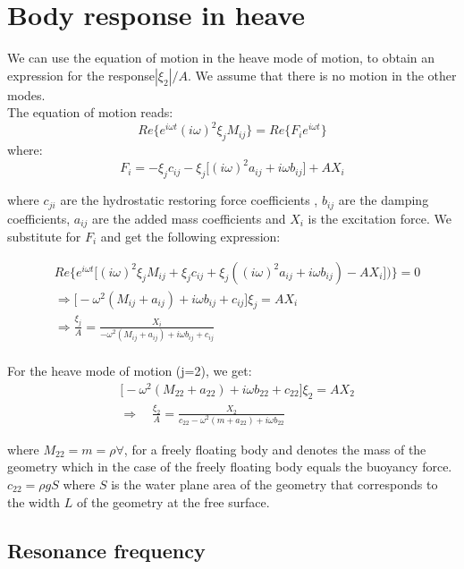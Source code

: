 \documentclass[a4paper,10pt]{article}
\begin{document}
\begin{figure}[H]
  \caption{}\label{X2_2_box3}
\endminipage
\end{figure}

\section{Body response in heave}

We can use the equation of motion in the heave mode of motion, to obtain an expression for the response$|\xi_2|/A$. We assume that there is no motion in the other modes.\\

The equation of motion reads:
$$Re \Big\{e^{i \omega t} (i \omega)^2 \xi_j M_{ij} \Big\} = Re \Big\{ F_i e^{i \omega t} \Big\}$$
where:
$$F_i = -\xi_j c_{i j} - \xi_j \Big[ (i \omega)^2 a_{i j} + i \omega b_{i j} \Big] + A X_i$$

where $c_{j i}$ are the hydrostatic restoring force coefficients , $b_{i j}$ are the damping coefficients, $a_{i j}$ are the added mass coefficients and $X_i$ is the excitation force. We substitute for $F_i$ and get the following expression:

\begin{align}
&Re \Big\{ e^{i \omega t}\big[(i \omega)^2 \xi_j M_{ij} + \xi_j c_{ij} +\xi_j ((i \omega)^2 a_{ij} + i \omega b_{ij})- AX_i \big]) \Big\} = 0\\
& \Rightarrow \Big[ -\omega^2(M_{ij} + a_{ij})+ i \omega b_{ij} + c_{ij} \Big] \xi_j = AX_i\\
& \Rightarrow \frac{\xi_j}{A} = \frac{X_i}{-\omega^2 (M_{ij} + a_{ij}) + i \omega b_{ij} + c_{ij}}\\
\end{align}

For the heave mode of motion (j=2), we get:
\begin{align}
& \Big[- \omega^2 (M_{2 2} + a_{2 2}) + i \omega b_{2 2} + c_{22} \Big] \xi_2 = A X_{2}\\[1em]
& \Rightarrow \quad \frac{\xi_2}{A} = \frac{X_2}{c_{22} - \omega^2(m + a_{22}) + i \omega b_{22} } 
\label{bodyrespons}
\end{align} 

where $M_{22} = m = \rho \forall$, for a freely floating body and denotes the mass of the geometry which in the case of the freely floating body equals the buoyancy force. $c_{22} = \rho g S$ where $S$ is the water plane area of the geometry that corresponds to the width $L$ of the geometry at the free surface.

\subsection{Resonance frequency}
\end{document}
